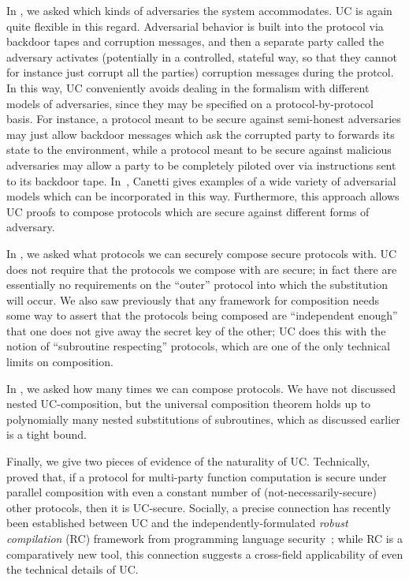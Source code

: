 In , we asked which kinds of adversaries the
system accommodates. UC is again quite flexible in this regard. Adversarial
behavior is built into the protocol via backdoor tapes and corruption messages,
and then a separate party called the adversary activates (potentially in a
controlled, stateful way, so that they cannot for instance just corrupt all the
parties) corruption messages during the protcol. In this way, UC conveniently
avoids dealing in the formalism with different models of adversaries, since they
may be specified on a protocol-by-protocol basis. For instance, a protocol meant
to be secure against semi-honest adversaries may just allow backdoor messages
which ask the corrupted party to forwards its state to the environment, while a
protocol meant to be secure against malicious adversaries may allow a party to
be completely piloted over via instructions sent to its backdoor tape.
In~\cite[Section 7.1.1]{canetti-2000}, Canetti gives examples of a wide variety
of adversarial models which can be incorporated in this way. Furthermore, this
approach allows UC proofs to compose protocols which are secure against
different forms of adversary.

In , we asked what protocols we can securely
compose secure protocols with. UC does not require that the protocols we compose
with are secure; in fact there are essentially no requirements on the ``outer''
protocol into which the substitution will occur. We also saw previously that any
framework for composition needs some way to assert that the protocols being
composed are ``independent enough'' that one does not give away the secret key
of the other; UC does this with the notion of ``subroutine respecting''
protocols, which are one of the only technical limits on composition.

In , we asked how many times we can compose
protocols. We have not discussed nested UC-composition, but the universal
composition theorem holds up to polynomially many nested substitutions of
subroutines, which as discussed earlier is a tight bound.

%
Finally, we give two pieces of evidence of the naturality of UC.
Technically,~\cite{lindell-2003} proved that, if a protocol for multi-party
function computation is secure under parallel composition with even a constant
number of (not-necessarily-secure) other protocols, then it is UC-secure.
Socially, a precise connection has recently been established between UC and the
independently-formulated \emph{robust compilation} (RC) framework from
programming language security~\cite{patrignani-2022}; while RC is a
comparatively new tool, this connection suggests a cross-field applicability of
even the technical details of UC.

